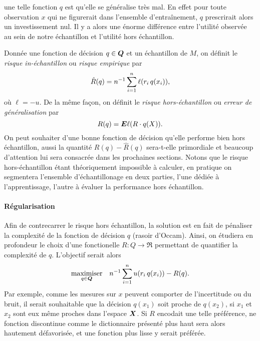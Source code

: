  une telle fonction $q$ est qu'elle se généralise très mal. En effet
pour toute observation $x$ qui ne figurerait dans l'ensemble d'entraînement, $q$
prescrirait alors un investissement nul. Il y a alors une énorme différence entre
l'utilité observée au sein de notre échantillon et l'utilité hors échantillon.

Donnée une fonction de décision $q \in \Q$ et un échantillon de $M$, on définit le
\textit{risque in-échantillon} ou \textit{risque empirique} par
\begin{equation}
  \hat R(q) = n^{-1}\sumi \ell(r_i\,q(x_i)),
\end{equation}
où $\ell = -u$. De la même façon, on définit le \textit{risque hors-échantillon} ou
\textit{erreur de généralisation} par
\begin{equation}
  R(q) = \E \ell(R \cdot q(X)).
\end{equation}
On peut souhaiter d'une bonne fonction de décision qu'elle performe bien hors échantillon,
aussi la quantité $R(q) - \hat R(q)$ sera-t-elle primordiale et beaucoup d'attention lui
sera consacrée dans les prochaines sections. Notons que le risque hors-échantillon étant
théoriquement impossible à calculer, en pratique on segmentera l'ensemble d'échantillonage
en deux parties, l'une dédiée à l'apprentissage, l'autre à évaluer la performance hors
échantillon.


\paragraph{Régularisation}

Afin de contrecarrer le risque hors échantillon, la solution est en fait de pénaliser la
complexité de la fonction de décision $q$ (rasoir d'Occam). Ainsi, on étudiera en
profondeur le choix d'une fonctionelle $R : Q \to \Re$ permettant de quantifier la complexité
de $q$. L'objectif serait alors
\begin{equation}
  \maximizeEquation[q \in \Q]{n^{-1} \sumi u(r_i\, q(x_i)) - R(q).}
\end{equation}
Par exemple, comme les mesures sur $x$ peuvent comporter de l'incertitude ou du bruit, il
serait souhaitable que la décision $q(x_1)$ soit proche de $q(x_2)$, si $x_1$ et $x_2$
sont eux même proches dans l'espace $\X$. Si $R$ encodait une telle préférence, ne
fonction discontinue comme le dictionnaire présenté plus haut sera alors hautement
défavorisée, et une fonction plus lisse y serait préférée.




